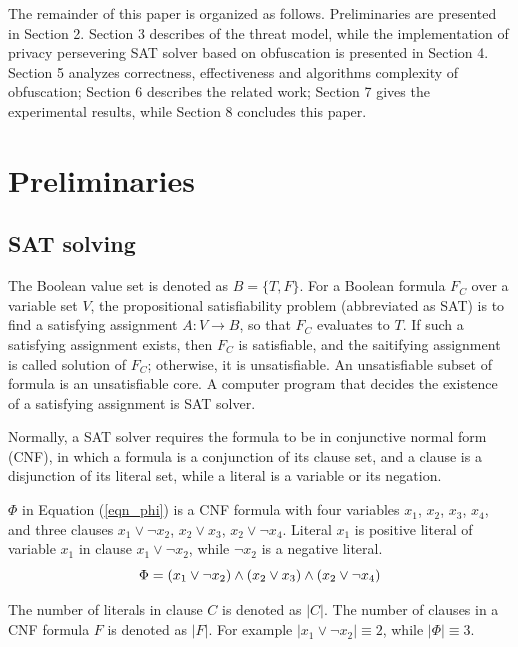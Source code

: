 \documentclass[conference,compsocconf]{IEEEtran}
\begin{document}
The remainder of this paper is organized as follows.
Preliminaries are presented in Section 2.
Section 3 describes of the threat model,
while the implementation of privacy persevering SAT solver based on obfuscation is presented in Section 4.
Section 5 analyzes correctness, effectiveness and algorithms complexity of obfuscation;
Section 6 describes the related work;
Section 7 gives the experimental results,
while Section 8 concludes this paper.
%
%

\section{Preliminaries}

\subsection{SAT solving}
The Boolean value set is denoted as $B=\{T,F\}$.
For a Boolean formula $F_C$ over a variable set $V$,
the propositional satisfiability problem (abbreviated as SAT) is
to find a satisfying assignment $A : V\to B$,
so that $F_C$ evaluates to $T$.
If such a satisfying assignment exists,
then $F_C$ is satisfiable, and the saitifying assignment is called solution of $F_C$;
otherwise,
it is unsatisfiable.
An unsatisfiable subset of formula is an unsatisfiable core.
A computer program that decides the existence of a
satisfying assignment is SAT solver\cite{Minisat}.

Normally,
a SAT solver requires the formula to be in conjunctive normal form (CNF),
in which a formula is a conjunction of its clause set,
and a clause is a disjunction of its literal set,
while a literal is a variable or its negation.

$\Phi$ in Equation (\ref{eqn_phi}) is a CNF formula
with four variables $x_1$, $x_2$, $x_3$, $x_4$,
and three clauses $x_1\vee \neg x_2$, $x_2\vee x_3$, $x_2\vee \neg x_4$.
Literal $x_1$ is positive literal of variable $x_1$ in clause $x_1\vee \neg x_2$,
while $ \neg x_2$ is a negative literal.
\begin{equation}\label{eqn_phi}
\centering \Phi=(x_1\vee \neg x_2)
\wedge(x_2\vee x_3)
\wedge(x_2\vee \neg x_4)
\end{equation}

The number of literals in clause $C$ is denoted as $|C|$.
The number of clauses in a CNF formula $F$ is denoted as $|F|$.
For example $| x_1\vee  \neg x_2 |\equiv 2$,
while $|\Phi|\equiv 3$.
\end{document}
